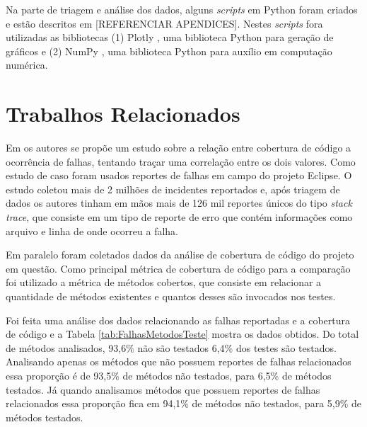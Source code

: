 \documentclass[11.5pt]{article}
\begin{document}
Na parte de triagem e análise dos dados, alguns \textit{scripts} em Python foram criados e estão
descritos em [REFERENCIAR APENDICES]. Nestes \textit{scripts} fora utilizadas as bibliotecas
(1) Plotly \cite{plotly}, uma biblioteca Python para geração de gráficos e (2) NumPy \cite{numpy},
uma biblioteca Python para auxílio em computação numérica.



\section{Trabalhos Relacionados}

Em \cite{unitTestedCrash} os autores se propõe um estudo sobre a relação entre cobertura de código
a ocorrência de falhas, tentando traçar uma correlação entre os dois valores.
Como estudo de caso foram usados reportes de falhas em campo do projeto Eclipse.
O estudo coletou mais de 2 milhões de incidentes reportados e, após triagem de dados os autores
tinham em mãos mais de 126 mil reportes únicos do tipo \textit{stack trace}, que consiste em um tipo
de reporte de erro que contém informações como arquivo e linha de onde ocorreu a falha.

Em paralelo foram coletados dados da análise de cobertura de código do projeto em questão.
Como principal métrica de cobertura de código para a comparação foi utilizado a métrica de métodos
cobertos, que consiste em relacionar a quantidade de métodos existentes e quantos desses são
invocados nos testes.

Foi feita uma análise dos dados relacionando as falhas reportadas e a cobertura de código e a Tabela
\ref{tab:FalhasMetodosTeste} mostra os dados obtidos.
Do total de métodos analisados, 93,6\% não são testados 6,4\% dos testes são testados.
Analisando apenas os métodos que não possuem reportes de falhas relacionados essa proporção é de
93,5\% de métodos não testados, para 6,5\% de métodos testados.
Já quando analisamos métodos que possuem reportes de falhas relacionados essa proporção fica em
94,1\% de métodos não testados, para 5,9\% de métodos testados.
\end{document}
